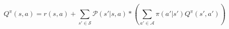 \documentclass{../main.tex}{subfiles}
\begin{document}
\begin{equation}\label{equation:bellman:action-value-function}
Q^{\pi}(s, a) = r(s, a) + \sum_{s' \in \mathcal{S}} \mathcal{P}(s' | s, a) * (\sum_{a' \in \mathcal{A}} \pi(a' | s') Q^{\pi}(s', a'))
\end{equation}

\end{document}
